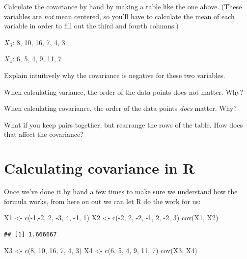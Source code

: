 \documentclass[
]{book}
\newenvironment{Shaded}{\begin{snugshade}}{\end{snugshade}}
\newcommand{\DecValTok}[1]{\textcolor[rgb]{0.00,0.00,0.81}{#1}}
\newcommand{\FunctionTok}[1]{\textcolor[rgb]{0.00,0.00,0.00}{#1}}
\newcommand{\NormalTok}[1]{#1}
\newcommand{\OtherTok}[1]{\textcolor[rgb]{0.56,0.35,0.01}{#1}}
\newcommand{\SpecialCharTok}[1]{\textcolor[rgb]{0.00,0.00,0.00}{#1}}
\begin{document}
Calculate the covariance by hand by making a table like the one above. (These variables are \emph{not} mean centered, so you'll have to calculate the mean of each variable in order to fill out the third and fourth columns.)

\(X_{3}\): 8, 10, 16, 7, 4, 3

\(X_{4}\): 6, 5, 4, 9, 11, 7

Explain intuitively why the covariance is negative for these two variables.

When calculating variance, the order of the data points does not matter. Why?

When calculating covariance, the order of the data points \emph{does} matter. Why?

What if you keep pairs together, but rearrange the rows of the table. How does that affect the covariance?

\hypertarget{covariance-r}{%
\section{Calculating covariance in R}\label{covariance-r}}

Once we've done it by hand a few times to make sure we understand how the formula works, from here on out we can let R do the work for us:

\begin{Shaded}
\begin{Highlighting}[]
\NormalTok{X1 }\OtherTok{\textless{}{-}} \FunctionTok{c}\NormalTok{(}\SpecialCharTok{{-}}\DecValTok{1}\NormalTok{,}\SpecialCharTok{{-}}\DecValTok{2}\NormalTok{, }\DecValTok{2}\NormalTok{, }\SpecialCharTok{{-}}\DecValTok{3}\NormalTok{, }\DecValTok{4}\NormalTok{, }\SpecialCharTok{{-}}\DecValTok{1}\NormalTok{, }\DecValTok{1}\NormalTok{)}
\NormalTok{X2 }\OtherTok{\textless{}{-}} \FunctionTok{c}\NormalTok{(}\SpecialCharTok{{-}}\DecValTok{2}\NormalTok{, }\DecValTok{2}\NormalTok{, }\SpecialCharTok{{-}}\DecValTok{2}\NormalTok{, }\SpecialCharTok{{-}}\DecValTok{1}\NormalTok{, }\DecValTok{2}\NormalTok{, }\SpecialCharTok{{-}}\DecValTok{2}\NormalTok{, }\DecValTok{3}\NormalTok{)}
\FunctionTok{cov}\NormalTok{(X1, X2)}
\end{Highlighting}
\end{Shaded}

\begin{verbatim}
## [1] 1.666667
\end{verbatim}

\begin{Shaded}
\begin{Highlighting}[]
\NormalTok{X3 }\OtherTok{\textless{}{-}} \FunctionTok{c}\NormalTok{(}\DecValTok{8}\NormalTok{, }\DecValTok{10}\NormalTok{, }\DecValTok{16}\NormalTok{, }\DecValTok{7}\NormalTok{, }\DecValTok{4}\NormalTok{, }\DecValTok{3}\NormalTok{)}
\NormalTok{X4 }\OtherTok{\textless{}{-}} \FunctionTok{c}\NormalTok{(}\DecValTok{6}\NormalTok{, }\DecValTok{5}\NormalTok{, }\DecValTok{4}\NormalTok{, }\DecValTok{9}\NormalTok{, }\DecValTok{11}\NormalTok{, }\DecValTok{7}\NormalTok{)}
\FunctionTok{cov}\NormalTok{(X3, X4)}
\end{Highlighting}
\end{Shaded}
\end{document}
